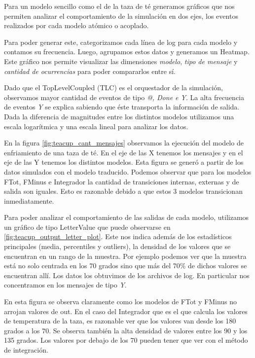 Para un modelo sencillo como el de la taza de té generamos gráficos que nos
permiten analizar el comportamiento de la simulación en dos ejes, los eventos
realizados por cada modelo atómico o acoplado.

Para poder generar este, categorizamos cada línea de log para cada modelo y
contamos su frecuencia. Luego, agrupamos estos datos y generamos un Heatmap.
Este gráfico nos permite visualizar las dimensiones \textit{modelo}, \textit{tipo de mensaje } y
\textit{cantidad de ocurrencias} para poder compararlos entre sí.

Dado que el TopLevelCoupled (TLC)  es el orquestador de la simulación,
observamos mayor cantidad de eventos de tipo \textit{@, Done e Y}. La alta
frecuencia de eventos \textit{Y} se explica sabiendo que éste  transporta la
información de salida. Dada la diferencia de magnitudes entre los distintos
modelos utilizamos una escala logarítmica y una escala lineal para analizar los
datos.

En la figura \ref{fig:teacup_cant_mensajes} observamos la  ejecución del modelo
de enfriamiento de una taza de té. En el eje de las X tenemos los mensajes y en el eje de las Y tenemos los distintos modelos. Esta figura se generó a partir de los datos simulados con el modelo traducido.
Podemos observar que para los modelos FTot, FMinus e Integrador la cantidad de transiciones internas, externas y de salida
son iguales. Esto es razonable debido a que estos 3 modelos transicionan
inmediatamente.

Para poder analizar el comportamiento de las salidas de cada modelo, utilizamos
un gráfico de tipo LetterValue que puede observarse en \ref{fig:teacup_output_letter_plot}.
Este nos indica además de los estadísticos
principales (media, percentiles y outliers), la densidad de los valores que se
encuentran en un rango de la muestra. Por ejemplo podemos ver que la muestra
está no solo centrada en los 70 grados sino que más del 70\% de dichos valores
se encuentran allí. Los datos los obtuvimos de los archivos de log. En
particular nos concentramos en los mensajes de tipo \textit{Y}.

En esta figura se observa claramente como los modelos de FTot y FMinus no
arrojan valores de out. En el caso del Integrador que es el que calcula los
valores de temperatura de la taza, es razonable ver que los valores van desde los 180 grados a los 70. Se observa también la alta densidad de valores entre los 90 y los 135 grados.  Los valores por debajo de los 70 pueden tener que ver con el método de integración. 

